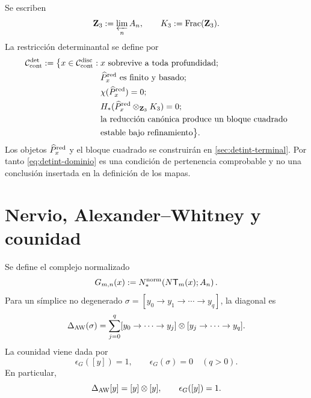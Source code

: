 Se escriben
\begin{equation}\label{eq:detint-z3-k3}
 \mathbf Z_3:=\varprojlim_n A_n,
 \qquad
 K_3:=\operatorname{Frac}(\mathbf Z_3).
\end{equation}
La restricción determinantal se define por
\begin{equation}\label{eq:detint-dominio}
\begin{split}
 \mathcal C_{\rm cont}^{\rm det}:=
 \bigl\{x\in\mathcal C_{\rm cont}^{\rm disc}:{}&
 x\text{ sobrevive a toda profundidad};\\
 &\widehat P_x^{\rm red}\text{ es finito y basado};\\
 &\chi(\widehat P_x^{\rm red})=0;\\
 &H_*(\widehat P_x^{\rm red}\otimes_{\mathbf Z_3}K_3)=0;\\
 &\text{la reducción canónica produce un bloque cuadrado}\\
 &\text{estable bajo refinamiento}\bigr\}.
\end{split}
\end{equation}
Los objetos \(\widehat P_x^{\rm red}\) y el bloque cuadrado se construirán
en \cref{sec:detint-terminal}. Por tanto
\eqref{eq:detint-dominio} es una condición de pertenencia comprobable y no
una conclusión insertada en la definición de los mapas.

\section{Nervio, Alexander--Whitney y counidad}

Se define el complejo normalizado
\begin{equation}\label{eq:detint-gmn}
 G_{m,n}(x):=
 N_*^{\rm norm}\!\left(N\mathsf T_m(x);A_n\right).
\end{equation}
Para un símplice no degenerado
\(\sigma=[y_0\to y_1\to\cdots\to y_q]\), la diagonal es
\begin{equation}\label{eq:detint-aw}
 \Delta_{\rm AW}(\sigma)
 =\sum_{j=0}^q
 [y_0\to\cdots\to y_j]\otimes
 [y_j\to\cdots\to y_q].
\end{equation}
La counidad viene dada por
\begin{equation}\label{eq:detint-counidad-g}
 \epsilon_G([y])=1,
 \qquad
 \epsilon_G(\sigma)=0\quad(q>0).
\end{equation}
En particular,
\begin{equation}\label{eq:detint-vertice-grouplike}
 \Delta_{\rm AW}[y]=[y]\otimes[y],
 \qquad
 \epsilon_G([y])=1.
\end{equation}

